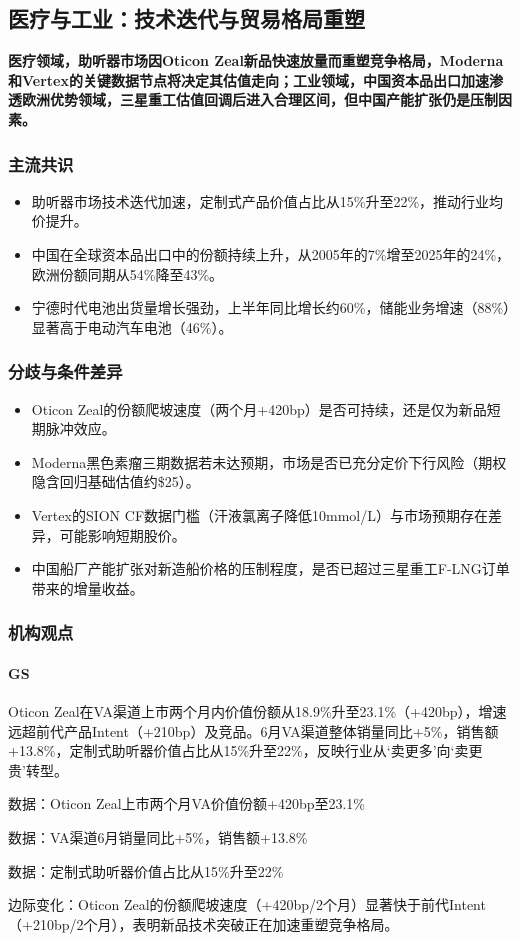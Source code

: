 \documentclass[11pt]{ctexart}
\begin{document}
\subsection{医疗与工业：技术迭代与贸易格局重塑}
\textbf{医疗领域，助听器市场因Oticon Zeal新品快速放量而重塑竞争格局，Moderna和Vertex的关键数据节点将决定其估值走向；工业领域，中国资本品出口加速渗透欧洲优势领域，三星重工估值回调后进入合理区间，但中国产能扩张仍是压制因素。}
\subsubsection*{主流共识}
\begin{itemize}
  \item 助听器市场技术迭代加速，定制式产品价值占比从15\%升至22\%，推动行业均价提升。
  \item 中国在全球资本品出口中的份额持续上升，从2005年的7\%增至2025年的24\%，欧洲份额同期从54\%降至43\%。
  \item 宁德时代电池出货量增长强劲，上半年同比增长约60\%，储能业务增速（88\%）显著高于电动汽车电池（46\%）。
\end{itemize}
\subsubsection*{分歧与条件差异}
\begin{itemize}
  \item Oticon Zeal的份额爬坡速度（两个月+420bp）是否可持续，还是仅为新品短期脉冲效应。
  \item Moderna黑色素瘤三期数据若未达预期，市场是否已充分定价下行风险（期权隐含回归基础估值约\$25）。
  \item Vertex的SION CF数据门槛（汗液氯离子降低10mmol/L）与市场预期存在差异，可能影响短期股价。
  \item 中国船厂产能扩张对新造船价格的压制程度，是否已超过三星重工F-LNG订单带来的增量收益。
\end{itemize}
\subsubsection*{机构观点}
\paragraph{GS} Oticon Zeal在VA渠道上市两个月内价值份额从18.9\%升至23.1\%（+420bp），增速远超前代产品Intent（+210bp）及竞品。6月VA渠道整体销量同比+5\%，销售额+13.8\%，定制式助听器价值占比从15\%升至22\%，反映行业从‘卖更多’向‘卖更贵’转型。
{\small\color{refgray}数据：Oticon Zeal上市两个月VA价值份额+420bp至23.1\%\par}
{\small\color{refgray}数据：VA渠道6月销量同比+5\%，销售额+13.8\%\par}
{\small\color{refgray}数据：定制式助听器价值占比从15\%升至22\%\par}
{\small\color{refgray}边际变化：Oticon Zeal的份额爬坡速度（+420bp/2个月）显著快于前代Intent（+210bp/2个月），表明新品技术突破正在加速重塑竞争格局。\par}
\end{document}
